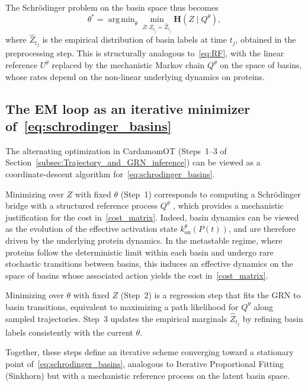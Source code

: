 \documentclass[a4paper, 11pt]{article}
\DeclareMathOperator*{\argmin}{arg\,min}
\theoremstyle{plain}
\theoremstyle{remark}
\begin{document}
\begin{appendices}
The Schrödinger problem on the basin space thus becomes
\begin{equation}
\label{eq:schrodinger_basins}
\theta^* = \argmin_\theta
\min_{Z: Z_{t_j} = \hat{Z}_{t_j}}
\mathbf{H}(Z \mid Q^\theta),
\end{equation}
where $\hat{Z}_{t_j}$ is the empirical distribution of basin labels at time $t_j$, obtained in the preprocessing step. This is structurally analogous to~\eqref{eq:RF}, with the linear reference $U^\theta$ replaced by the mechanistic Markov chain $Q^\theta$ on the space of basins, whose rates depend on the non-linear underlying dynamics on proteins.

\subsection[The EM loop as an iterative minimizer of (reference)]{The EM loop as an iterative minimizer of~\eqref{eq:schrodinger_basins}}

The alternating optimization in CardamomOT (Steps~1–3 of Section~\ref{subsec:Trajectory_and_GRN_inference}) can be viewed as a coordinate-descent algorithm for~\eqref{eq:schrodinger_basins}.

Minimizing over $Z$ with fixed $\theta$ (Step~1) corresponds to computing a Schrödinger bridge with a structured reference process $Q^\theta$ \cite{baradat2024convergence}, which provides a mechanistic justification for the cost in~\eqref{cost_matrix}. Indeed, basin dynamics can be viewed as the evolution of the effective activation state $k_{\mathrm{on}}^\theta(P(t))$, and are therefore driven by the underlying protein dynamics. In the metastable regime, where proteins follow the deterministic limit within each basin and undergo rare stochastic transitions between basins, this induces an effective dynamics on the space of basins whose associated action yields the cost in~\eqref{cost_matrix}.

Minimizing over $\theta$ with fixed $Z$ (Step~2) is a regression step that fits the GRN to basin transitions, equivalent to maximizing a path likelihood for $Q^\theta$ along sampled trajectories. Step~3 updates the empirical marginals $\hat{Z}_{t_j}$ by refining basin labels consistently with the current $\theta$.

Together, these steps define an iterative scheme converging toward a stationary point of~\eqref{eq:schrodinger_basins}, analogous to Iterative Proportional Fitting (Sinkhorn) but with a mechanistic reference process on the latent basin space.


\end{appendices}
\end{document}
